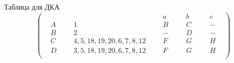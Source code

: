 \documentclass[a4paper,12pt]{article} %
\begin{document}
Таблица для ДКА\\
\[
\begin{pmatrix}
\hspace{20pt}&\hspace{20pt}&\hspace{10pt}a\hspace{10pt}&\hspace{10pt}b\hspace{10pt}&\hspace{10pt}c\hspace{10pt}\\

\hspace{10pt}A\hspace{9pt}&\hspace{10pt}1\hspace{9pt}&\hspace{10pt}B\hspace{10pt}&\hspace{10pt}C\hspace{10pt}&\hspace{10pt}-\hspace{10pt}\\

\hspace{10pt}B\hspace{9pt}&\hspace{10pt}2\hspace{9pt}&\hspace{10pt}-\hspace{10pt}&\hspace{10pt}D\hspace{10pt}&\hspace{10pt}-\hspace{10pt}\\

\hspace{10pt}C\hspace{9pt}&\hspace{10pt}4,5,18,19, 20,6,7,8,12\hspace{9pt}&\hspace{10pt}F\hspace{10pt}&\hspace{10pt}G\hspace{10pt}&\hspace{10pt}H\hspace{10pt}\\

\hspace{10pt}D\hspace{9pt}&\hspace{10pt}3,5,18,19, 20,6,7,8,12\hspace{9pt}&\hspace{10pt}F\hspace{10pt}&\hspace{10pt}G\hspace{10pt}&\hspace{10pt}H\hspace{10pt}\\



\end{pmatrix}\]
\end{document}
